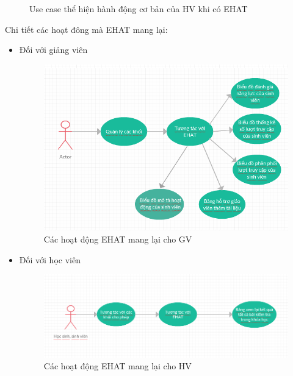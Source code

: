 \begin{itemize}
\begin{center}
\begin{figure}[htp]
\begin{center}
			\end{center}
			\caption{Use case thể hiện hành động cơ bản của HV khi có EHAT}
			\label{refhinh13}
		\end{figure}
	\end{center}
\end{itemize}

Chi tiết các hoạt đông mà EHAT mang lại:
\begin{itemize}
	\item Đối với giảng viên
	\begin{center}
		\begin{figure}[htp]
			\begin{center}
				\includegraphics[scale=0.7]{img/chitietehatgv}
			\end{center}
			\caption{Các hoạt động EHAT mang lại cho GV}
			\label{refhinh14}
		\end{figure}
	\end{center}
	\vskip 4cm
	\item Đối với học viên
	\begin{center}
		\begin{figure}[htp]
			\begin{center}
				\includegraphics[scale=0.7]{img/chitietehaths}
			\end{center}
			\caption{Các hoạt động EHAT mang lại cho HV}
			\label{refhinh15}
		\end{figure}
	\end{center}
\end{itemize}

